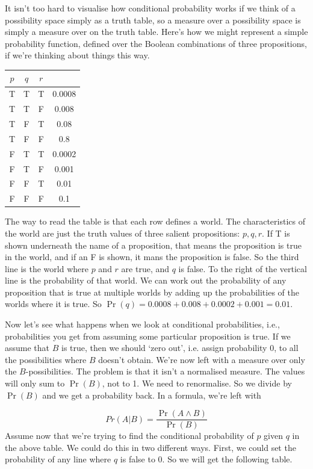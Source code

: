 \documentclass[openany]{book}
\begin{document}
It isn't too hard to visualise how conditional probability works if we think of a possibility space simply as a truth table, so a measure over a possibility space is simply a measure over on the truth table. Here's how we might represent a simple probability function, defined over the Boolean combinations of three propositions, if we're thinking about things this way. 

\begin{center} 
\begin{tabular}{c c c | c}
$p$ & $q$ & $r$ \\ \hline
T & T & T & 0.0008\\
T & T & F & 0.008\\
T & F & T & 0.08\\
T & F & F & 0.8\\
F & T & T & 0.0002\\
F & T & F & 0.001\\
F & F & T & 0.01\\
F & F & F & 0.1
\end{tabular} 
\end{center} 
The way to read the table is that each row defines a world. The characteristics of the world are just the truth values of three salient propositions: $p, q, r$. If T is shown underneath the name of a proposition, that means the proposition is true in the world, and if an F is shown, it mans the proposition is false. So the third line is the world where $p$ and $r$ are true, and $q$ is false. To the right of the vertical line is the probability of that world. We can work out the probability of any proposition that is true at multiple worlds by adding up the probabilities of the worlds where it is true. So $\Pr(q) = 0.0008 + 0.008 + 0.0002 + 0.001 = 0.01$.

Now let's see what happens when we look at conditional probabilities, i.e., probabilities you get from assuming some particular proposition is true. If we assume that $B$ is true, then we should `zero out', i.e. assign probability 0, to all the possibilities where $B$ doesn't obtain. We're now left with a measure over only the $B$-possibilities. The problem is that it isn't a normalised measure. The values will only sum to $\Pr(B)$, not to 1. We need to renormalise. So we divide by $\Pr(B)$ and we get a probability back. In a formula, we're left with

\begin{equation*}
Pr(A|B) = \frac{\Pr(A \wedge B)}{\Pr(B)}
\end{equation*}
Assume now that we're trying to find the conditional probability of $p$ given $q$ in the above table. We could do this in two different ways. First, we could set the probability of any line where $q$ is false to 0. So we will get the following table.
\end{document}

